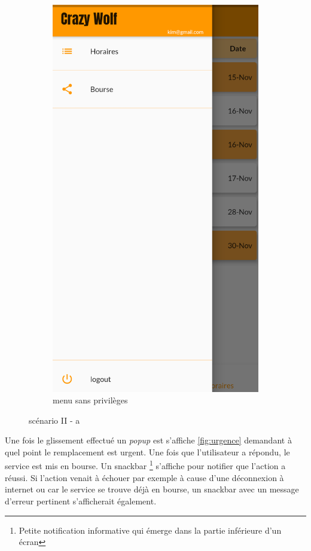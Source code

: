 \begin{figure}[!h]
\begin{subfigure}{.3\textwidth}
            \includegraphics[width=0.9\linewidth]{screenshots/scenario_02/menu_serveur_normal.png}
            \caption{menu sans privilèges}
            \label{fig:menu_sans_droits}
        \end{subfigure}
        \caption{scénario II - a}
        \label{fig:scen02a}
    \end{figure}

Une fois le glissement effectué un \textit{popup} est s'affiche \ref{fig:urgence} demandant
à quel point le remplacement est urgent. Une fois que l'utilisateur a répondu, le service est mis
en bourse. Un snackbar \footnote{Petite notification informative qui émerge dans la partie inférieure d'un écran} s'affiche pour notifier que l'action a réussi.
Si l'action venait à échouer par exemple à cause d'une déconnexion à internet ou car le service se trouve déjà en bourse, un snackbar avec un message 
d'erreur pertinent s'afficherait également.


